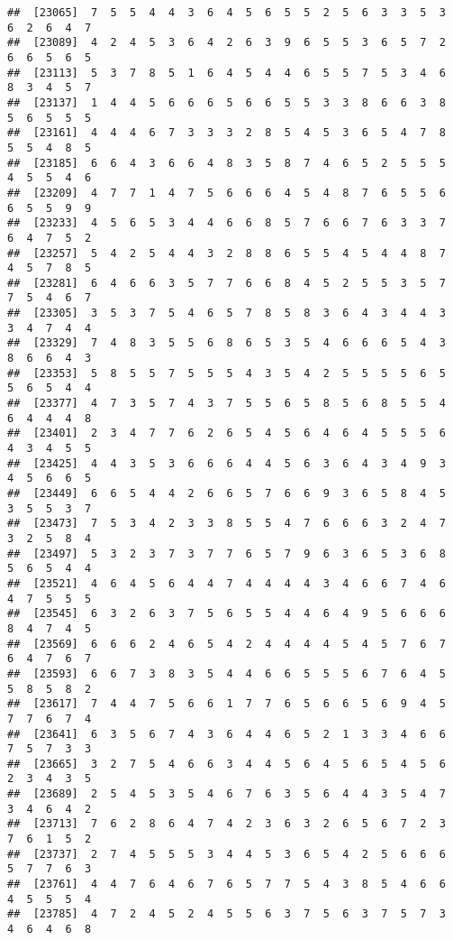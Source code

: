 \documentclass[
]{book}
\begin{document}
\begin{verbatim}
##  [23065]  7  5  5  4  4  3  6  4  5  6  5  5  2  5  6  3  3  5  3  6  2  6  4  7
##  [23089]  4  2  4  5  3  6  4  2  6  3  9  6  5  5  3  6  5  7  2  6  6  5  6  5
##  [23113]  5  3  7  8  5  1  6  4  5  4  4  6  5  5  7  5  3  4  6  8  3  4  5  7
##  [23137]  1  4  4  5  6  6  6  5  6  6  5  5  3  3  8  6  6  3  8  5  6  5  5  5
##  [23161]  4  4  4  6  7  3  3  3  2  8  5  4  5  3  6  5  4  7  8  5  5  4  8  5
##  [23185]  6  6  4  3  6  6  4  8  3  5  8  7  4  6  5  2  5  5  5  4  5  5  4  6
##  [23209]  4  7  7  1  4  7  5  6  6  6  4  5  4  8  7  6  5  5  6  6  5  5  9  9
##  [23233]  4  5  6  5  3  4  4  6  6  8  5  7  6  6  7  6  3  3  7  6  4  7  5  2
##  [23257]  5  4  2  5  4  4  3  2  8  8  6  5  5  4  5  4  4  8  7  4  5  7  8  5
##  [23281]  6  4  6  6  3  5  7  7  6  6  8  4  5  2  5  5  3  5  7  7  5  4  6  7
##  [23305]  3  5  3  7  5  4  6  5  7  8  5  8  3  6  4  3  4  4  3  3  4  7  4  4
##  [23329]  7  4  8  3  5  5  6  8  6  5  3  5  4  6  6  6  5  4  3  8  6  6  4  3
##  [23353]  5  8  5  5  7  5  5  5  4  3  5  4  2  5  5  5  5  6  5  5  6  5  4  4
##  [23377]  4  7  3  5  7  4  3  7  5  5  6  5  8  5  6  8  5  5  4  6  4  4  4  8
##  [23401]  2  3  4  7  7  6  2  6  5  4  5  6  4  6  4  5  5  5  6  4  3  4  5  5
##  [23425]  4  4  3  5  3  6  6  6  4  4  5  6  3  6  4  3  4  9  3  4  5  6  6  5
##  [23449]  6  6  5  4  4  2  6  6  5  7  6  6  9  3  6  5  8  4  5  3  5  5  3  7
##  [23473]  7  5  3  4  2  3  3  8  5  5  4  7  6  6  6  3  2  4  7  3  2  5  8  4
##  [23497]  5  3  2  3  7  3  7  7  6  5  7  9  6  3  6  5  3  6  8  5  6  5  4  4
##  [23521]  4  6  4  5  6  4  4  7  4  4  4  4  3  4  6  6  7  4  6  4  7  5  5  5
##  [23545]  6  3  2  6  3  7  5  6  5  5  4  4  6  4  9  5  6  6  6  8  4  7  4  5
##  [23569]  6  6  6  2  4  6  5  4  2  4  4  4  4  5  4  5  7  6  7  6  4  7  6  7
##  [23593]  6  6  7  3  8  3  5  4  4  6  6  5  5  5  6  7  6  4  5  5  8  5  8  2
##  [23617]  7  4  4  7  5  6  6  1  7  7  6  5  6  6  5  6  9  4  5  7  7  6  7  4
##  [23641]  6  3  5  6  7  4  3  6  4  4  6  5  2  1  3  3  4  6  6  7  5  7  3  3
##  [23665]  3  2  7  5  4  6  6  3  4  4  5  6  4  5  6  5  4  5  6  2  3  4  3  5
##  [23689]  2  5  4  5  3  5  4  6  7  6  3  5  6  4  4  3  5  4  7  3  4  6  4  2
##  [23713]  7  6  2  8  6  4  7  4  2  3  6  3  2  6  5  6  7  2  3  7  6  1  5  2
##  [23737]  2  7  4  5  5  5  3  4  4  5  3  6  5  4  2  5  6  6  6  5  7  7  6  3
##  [23761]  4  4  7  6  4  6  7  6  5  7  7  5  4  3  8  5  4  6  6  4  5  5  5  4
##  [23785]  4  7  2  4  5  2  4  5  5  6  3  7  5  6  3  7  5  7  3  4  6  4  6  8

\end{verbatim}
\end{document}
